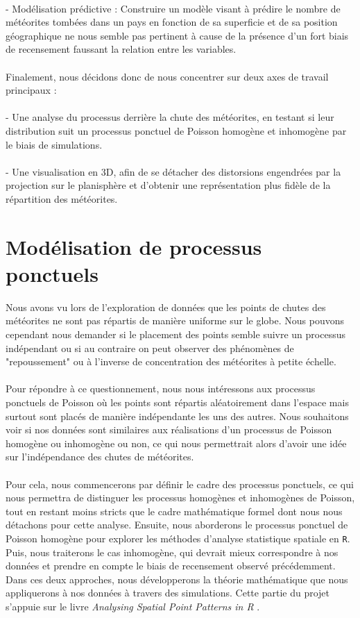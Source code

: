 \documentclass[12pt]{article}
\begin{document}
\\
- Modélisation prédictive : Construire un modèle visant à prédire le nombre de météorites tombées dans un pays en fonction de sa superficie et de sa position géographique ne nous semble pas pertinent à cause de la présence d’un fort biais de recensement faussant la relation entre les variables.\\
\\
Finalement, nous décidons donc de nous concentrer sur deux axes de travail principaux :\\
\\
- Une analyse du processus derrière la chute des météorites, en testant si leur distribution suit un processus ponctuel de Poisson homogène et inhomogène par le biais de simulations.\\
\\
- Une visualisation en 3D, afin de se détacher des distorsions engendrées par la projection sur le planisphère et d’obtenir une représentation plus fidèle de la répartition des météorites.\\

\section{Modélisation de processus ponctuels}
Nous avons vu lors de l'exploration de données que les points de chutes des météorites ne sont pas répartis de manière uniforme sur le globe. Nous pouvons cependant nous demander si le placement des points semble suivre un processus indépendant ou si au contraire on peut observer des phénomènes de "repoussement" ou à l'inverse de concentration des météorites à petite échelle.\\
\\
Pour répondre à ce questionnement, nous nous intéressons aux processus ponctuels de Poisson où les points sont répartis aléatoirement dans l'espace mais surtout sont placés de manière indépendante les uns des autres. Nous souhaitons voir si nos données sont similaires aux réalisations d'un processus de Poisson homogène ou inhomogène ou non, ce qui nous permettrait alors d'avoir une idée sur l'indépendance des chutes de météorites.\\
\\
Pour cela, nous commencerons par définir le cadre des processus ponctuels, ce qui nous permettra de distinguer les processus homogènes et inhomogènes de Poisson, tout en restant moins stricts que le cadre mathématique formel dont nous nous détachons pour cette analyse. Ensuite, nous aborderons le processus ponctuel de Poisson homogène pour explorer les méthodes d'analyse statistique spatiale en \texttt{R}. Puis, nous traiterons le cas inhomogène, qui devrait mieux correspondre à nos données et prendre en compte le biais de recensement observé précédemment. Dans ces deux approches, nous développerons la théorie mathématique que nous appliquerons à nos données à travers des simulations. Cette partie du projet s'appuie sur le livre \textit{Analysing Spatial Point Patterns in R} \cite{analysing_spacial_points}.
\end{document}
